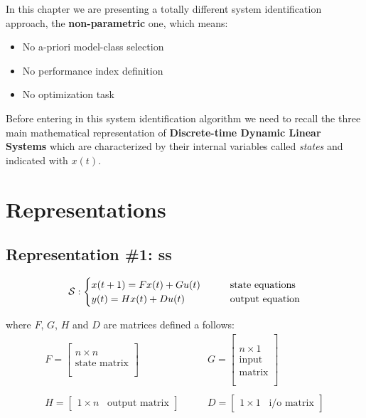 In this chapter we are presenting a totally different system identification approach, the \textbf{non-parametric} one, which means:
\begin{itemize}
    \item No a-priori model-class selection
    \item No performance index definition
    \item No optimization task
\end{itemize}

Before entering in this system identification algorithm we need to recall the three main mathematical representation of \textbf{Discrete-time Dynamic Linear Systems} which are characterized by their internal variables called \emph{states} and indicated with $x(t)$.


\section{Representations}

\subsection{Representation \#1: \acrfull{ss}}

\[
\mathcal{S}: 
\begin{cases}
    x(t+1) = F x(t) + G u(t) & \qquad \text{state equations} \\
    y(t) = H x(t) + D u(t) & \qquad \text{output equation}
\end{cases}
\]

where $F$, $G$, $H$ and $D$ are matrices defined a follows:
\begin{align*}
    F = \begin{bmatrix}
        \\
        n \times n \\
        \text{state matrix} \\ \\
    \end{bmatrix}
    &
    \qquad
    G = \begin{bmatrix}
        \\
        \\
        n \times 1 \\
        \text{input} \\
        \text{matrix} \\ \\
    \end{bmatrix}
    \\ \\
    H = \begin{bmatrix}
        1 \times n \;\;\; \text{output matrix}
    \end{bmatrix}
    &
    \qquad
    D = \begin{bmatrix}
        1 \times 1 \;\;\; \text{i/o matrix}
    \end{bmatrix}
\end{align*}

